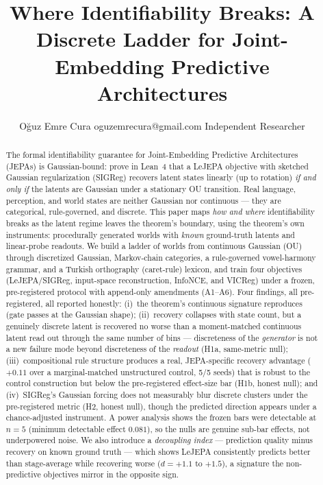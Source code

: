 \documentclass[10pt]{article}
\title{Where Identifiability Breaks: A Discrete Ladder for
Joint-Embedding Predictive Architectures}
\author{\name O\u{g}uz Emre Cura \email oguzemrecura@gmail.com
      \addr Independent Researcher}
\begin{document}
\maketitle

\begin{abstract}
\noindent
The formal identifiability guarantee for Joint-Embedding Predictive
Architectures (JEPAs) is Gaussian-bound: \citet{klindt2026lejepa} prove in
Lean~4 that a LeJEPA objective with sketched Gaussian regularization (SIGReg)
recovers latent states linearly (up to rotation) \emph{if and only if} the
latents are Gaussian under a stationary OU transition. Real language,
perception, and world states are neither Gaussian nor continuous --- they are
categorical, rule-governed, and discrete. This paper maps \emph{how and where}
identifiability breaks as the latent regime leaves the theorem's boundary,
using the theorem's own instruments: procedurally generated worlds with
\emph{known} ground-truth latents and linear-probe readouts. We build a ladder
of worlds from continuous Gaussian (OU) through discretized Gaussian,
Markov-chain categories, a rule-governed vowel-harmony grammar, and a Turkish
orthography (caret-rule) lexicon, and train four objectives (LeJEPA/SIGReg,
input-space reconstruction, InfoNCE, and VICReg) under a frozen,
pre-registered protocol with append-only amendments (A1--A6). Four findings,
all pre-registered, all reported honestly: (i)~the theorem's continuous
signature reproduces (gate passes at the Gaussian shape); (ii)~recovery
collapses with state count, but a genuinely discrete latent is recovered no
worse than a moment-matched continuous latent read out through the same number
of bins --- discreteness of the \emph{generator} is not a new failure mode
beyond discreteness of the \emph{readout} (H1a, same-metric null);
(iii)~compositional rule structure produces a real, JEPA-specific recovery
advantage ($+0.11$ over a marginal-matched unstructured control, 5/5 seeds)
that is robust to the control construction but below the pre-registered
effect-size bar (H1b, honest null); and (iv)~SIGReg's Gaussian forcing does not
measurably blur discrete clusters under the pre-registered metric (H2, honest
null), though the predicted direction appears under a chance-adjusted
instrument. A power analysis shows the frozen bars were detectable at $n{=}5$
(minimum detectable effect $0.081$), so the nulls are genuine sub-bar effects,
not underpowered noise. We also introduce a \emph{decoupling index} ---
prediction quality minus recovery on known ground truth --- which shows LeJEPA
consistently predicts better than stage-average while recovering worse
($d{=}{+}1.1$ to $+1.5$), a signature the non-predictive objectives mirror in
the opposite sign.
\end{abstract}
\end{document}
